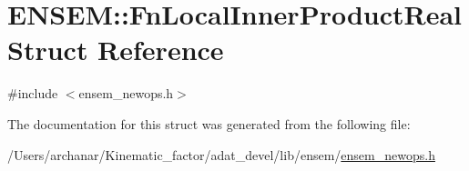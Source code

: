 \hypertarget{structENSEM_1_1FnLocalInnerProductReal}{}\section{E\+N\+S\+EM\+:\+:Fn\+Local\+Inner\+Product\+Real Struct Reference}
\label{structENSEM_1_1FnLocalInnerProductReal}


{\ttfamily \#include $<$ensem\+\_\+newops.\+h$>$}



The documentation for this struct was generated from the following file\+:\begin{DoxyCompactItemize}
\item 
/\+Users/archanar/\+Kinematic\+\_\+factor/adat\+\_\+devel/lib/ensem/\mbox{\hyperlink{lib_2ensem_2ensem__newops_8h}{ensem\+\_\+newops.\+h}}\end{DoxyCompactItemize}

